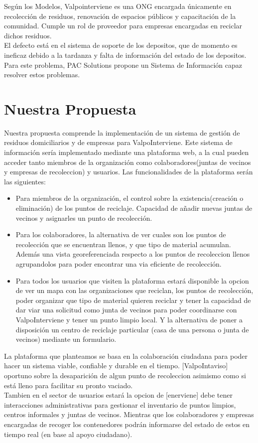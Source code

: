 \documentclass[paper=letter, fontsize=11pt]{scrartcl} %
\numberwithin{equation}{section} %
\numberwithin{figure}{section} %
\numberwithin{table}{section} %
\begin{document}
Según los Modelos, Valpointerviene es una ONG encargada únicamente en recolección de residuos, renovación de espacios públicos y capacitación de la comunidad. Cumple un rol de proveedor para empresas encargadas en reciclar dichos residuos.\\

El defecto está en el sistema de soporte de los depositos, que de momento es ineficaz debido a la tardanza y falta de información del estado de los depositos. Para este problema, PAC Solutions propone un Sistema de Información capaz resolver estos problemas.
\section{Nuestra Propuesta}
Nuestra propuesta comprende la implementación de un sistema de gestión de residuos domiciliarios y de empresas para ValpoInterviene. Este sistema de información sería implementado mediante una plataforma web, a la cual pueden acceder tanto miembros de la organización como colaboradores(juntas de vecinos y empresas de recoleccion) y usuarios. Las funcionalidades de la plataforma serán las siguientes:
\begin{itemize}
\item Para miembros de la organización, el control sobre la existencia(creación o eliminación) de los puntos de reciclaje. Capacidad de añadir nuevas juntas de vecinos y asignarles un punto de recolección.
\item Para los colaboradores, la alternativa de ver cuales son los puntos de recolección que se encuentran llenos, y que tipo de material acumulan. Además una vista georeferenciada respecto a los puntos de recoleccion llenos agrupandolos para poder encontrar una via eficiente de recolección.
\item Para todos los usuarios que visiten la plataforma estará disponible la opcion de ver un mapa con las organizaciones que reciclan, los puntos de recolección, poder organizar que tipo de material quieren reciclar y tener la capacidad de dar viar una solicitud como junta de vecinos para poder coordinarse con ValpoInterviene y tener un punto limpio local. Y la alternativa de poner a disposición un centro de reciclaje particular (casa de una persona o junta de vecinos) mediante un formulario. 
\end{itemize}

La plataforma que planteamos se basa en la colaboración ciudadana para poder hacer un sistema viable, confiable y durable en el tiempo. [ValpoIntaviso] oportuno sobre la desaparición de algun punto de recoleccion asimismo como si está lleno para facilitar su pronto vaciado.\\
Tambien en el sector de usuarios estará la opcion de [enerviene] debe tener interacciones administrativas para gestionar el inventario de puntos limpios, centros informales y juntas de vecinos. Mientras que los colaboradores y empresas encargadas de recoger los contenedores podrán informarse del estado de estos en tiempo real (en base al apoyo ciudadano).\\
\end{document}
